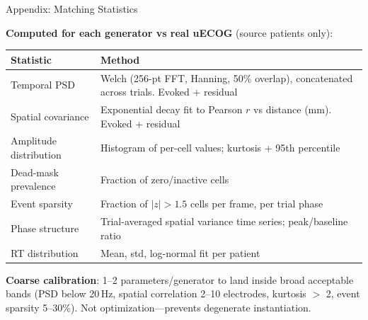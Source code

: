\documentclass[aspectratio=169, 11pt]{beamer}
\begin{document}
\begin{frame}[noframenumbering]{Appendix: Matching Statistics}

\small
\textbf{Computed for each generator vs real uECOG} (source patients only):

\vspace{0.3em}
\renewcommand{\arraystretch}{1.15}
\begin{tabular}{@{}L{3.5cm} L{9.5cm}@{}}
  \toprule
  \textbf{Statistic} & \textbf{Method} \\
  \midrule
  Temporal PSD & Welch (256-pt FFT, Hanning, 50\% overlap), concatenated across trials. Evoked + residual \\
  Spatial covariance & Exponential decay fit to Pearson $r$ vs distance (mm). Evoked + residual \\
  Amplitude distribution & Histogram of per-cell values; kurtosis + 95th percentile \\
  Dead-mask prevalence & Fraction of zero/inactive cells \\
  Event sparsity & Fraction of $|z| > 1.5$ cells per frame, per trial phase \\
  Phase structure & Trial-averaged spatial variance time series; peak/baseline ratio \\
  RT distribution & Mean, std, log-normal fit per patient \\
  \bottomrule
\end{tabular}

\vspace{0.5em}
\textbf{Coarse calibration}: 1--2 parameters/generator to land inside broad acceptable bands (PSD below 20\,Hz, spatial correlation 2--10 electrodes, kurtosis $>$ 2, event sparsity 5--30\%). Not optimization---prevents degenerate instantiation.
\end{frame}

\end{document}
